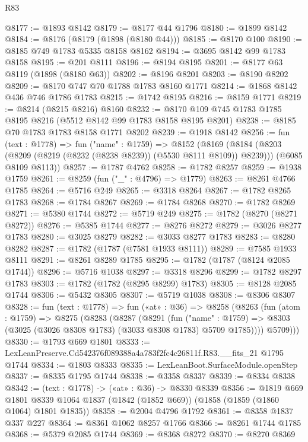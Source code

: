 \begin{lexlean}{R83}
\begin{coremodule}
@8177 := @1893 @8142
@8179 := @8177 @44 @1796
@8180 := @1899 @8142
@8184 := @8176 (@8179 (@1898 (@8180 @44)))
@8185 := @8170 @100
@8190 := @8185 @749 @1783 @5335 @8158 @8162
@8194 := @3695 @8142 @99 @1783 @8158
@8195 := @201 @8111
@8196 := @8194 @8195
@8201 := @8177 @63 @8119 (@1898 (@8180 @63))
@8202 := @8196 @8201
@8203 := @8190 @8202
@8209 := @8170 @747 @70 @1788 @1783 @8160 @1771
@8214 := @1868 @8142 @436 @746 @1786 @1783
@8215 := @1742 @8195
@8216 := @8159 @1771
@8219 := @8214 (@8215 @8216) @8160
@8232 := @8170 @109 @745 @1783 @1785 @8195 @8216 (@5512 @8142 @99 @1783 @8158 @8195 @8201)
@8238 := @8185 @70 @1783 @1783 @8158 @1771 @8202
@8239 := @1918 @8142
@8256 := fun (text : @1778) =>
  fun ("name" : @1759) =>
  @8152
    (@8169
      (@8184 (@8203 (@8209 (@8219 (@8232 (@8238 @8239)) (@5530 @8111 @8109)) @8239)))
      (@6085 @8109 @8113))
@8257 := @1787 @4762
@8258 := @1782 @8257
@8259 := @1938 @1759
@8261 := @8259 (fun ("_" : @4796) => @1779)
@8263 := @8261 @4766 @1785
@8264 := @5716 @249
@8265 := @3318 @8264
@8267 := @1782 @8265 @1783
@8268 := @1784 @8267
@8269 := @1784 @8268
@8270 := @1782 @8269
@8271 := @5380 @1744
@8272 := @5719 @249
@8275 := @1782 (@8270 (@8271 @8272))
@8276 := @5385 @1744
@8277 := @8276 @8272
@8279 := @3026 @8277 @1783
@8280 := @3025 @8279
@8282 := @3033 @8277 @1783
@8283 := @8280 @8282
@8287 := @1782 (@1787 (@7581 @1933 @8111))
@8289 := @7585 @1933 @8111
@8291 := @8261 @8289 @1785
@8295 := @1782 (@1787 (@8124 @2085 @1744))
@8296 := @5716 @1038
@8297 := @3318 @8296
@8299 := @1782 @8297 @1783
@8303 := @1782 (@1782 (@8295 @8299) @1783)
@8305 := @8128 @2085 @1744
@8306 := @5432 @8305
@8307 := @5719 @1038
@8308 := @8306 @8307
@8328 := fun (text : @1778) =>
  fun («at» : @36) =>
  @8258
    (@8263
      (fun (atom : @1759) =>
      @8275
        (@8283
          (@8287
            (@8291
              (fun ("name" : @1759) =>
              @8303 (@3025 (@3026 @8308 @1783) (@3033 @8308 @1783) @5709 @1785))))
          @5709)))
@8330 := @1793 @669 @1801
@8333 := LexLeanPreserve.Cd542376f089388a4a783f2fc4c26811f.R83.__fits_21 @1795 @1744
@8334 := @1803 @8333
@8335 := LexLeanBoot.SurfaceModule.openStep
@8337 := @8335 @1795 @1744
@8338 := @3358 @8337
@8339 := @8334 @8338
@8342 := (text : @1778) -> («at» : @36) -> @8330 @8339
@8356 := @1819
    @669
    @1801
    @8339
    @1064
    @1837
    (@1842 (@1852 @669))
    (@1858 (@1859 (@1860 @1064) @1801 @1835))
@8358 := @2004 @4796 @1792
@8361 := @8358 @1837 @337 @227
@8364 := @8361 @1062 @8257 @1766
@8366 := @8261 @1744 @1785
@8368 := @5379 @2085 @1744
@8369 := @8368 @8272
@8370 := @8270 @8369

\end{coremodule}
\end{lexlean}
